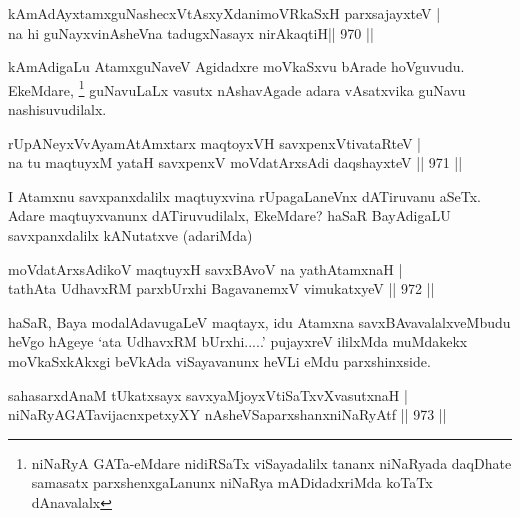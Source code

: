 \begin{shl}
kAmAdAyxtamxguNashecxVtAsxyXdanimoVRkaSxH parxsajayxteV | \\
na hi guNayxvinAsheVna tadugxNasayx nirAkaqtiH\hfill ||  970 ||  
\end{shl}

\begin{artha}
kAmAdigaLu AtamxguNaveV Agidadxre moVkaSxvu bArade hoVguvudu. EkeMdare, \footnote{niNaRyA GATa-eMdare nidiRSaTx viSayadalilx tananx niNaRyada daqDhate samasatx parxshenxgaLanunx niNaRya mADidadxriMda koTaTx dAnavalalx} guNavuLaLx vasutx nAshavAgade adara vAsatxvika guNavu nashisuvudilalx.
\end{artha}


\begin{shl}
rUpANeyxVvAyamAtAmx\s tarx maqtoyxVH savxpenxV\s tivataRteV | \\
na tu maqtuyxM yataH savxpenxV moVdatArxsAdi daqshayxteV \hfill||  971 ||  
\end{shl}

\begin{artha}
I Atamxnu savxpanxdalilx maqtuyxvina rUpagaLaneVnx dATiruvanu aSeTx. Adare maqtuyxvanunx dATiruvudilalx, EkeMdare? haSaR BayAdigaLU savxpanxdalilx kANutatxve (adariMda)
\end{artha}


\begin{shl}
moVdatArxsAdikoV maqtuyxH savxBAvoV na yathA\s \s tamxnaH | \\
tathA\s ta UdhavxRM parxbUrxhi BagavanemxV vimukatxyeV \hfill||  972 ||  
\end{shl}

\begin{artha}
haSaR, Baya modalAdavugaLeV maqtayx, idu Atamxna savxBAvavalalxveMbudu heVgo hAgeye `ata UdhavxRM bUrxhi.....' pujayxreV ililxMda muMdakekx moVkaSxkAkxgi beVkAda viSayavanunx heVLi eMdu parxshinxside.
\end{artha}


\begin{shl}
sahasarxdAnaM tUkatxsayx savxyaMjoyxVtiSaTxvXvasutxnaH | \\
niNaRyAGATavijacnxpetxyXY nAsheVSaparxshanxniNaRyAtf \hfill||  973 ||  
\end{shl}

